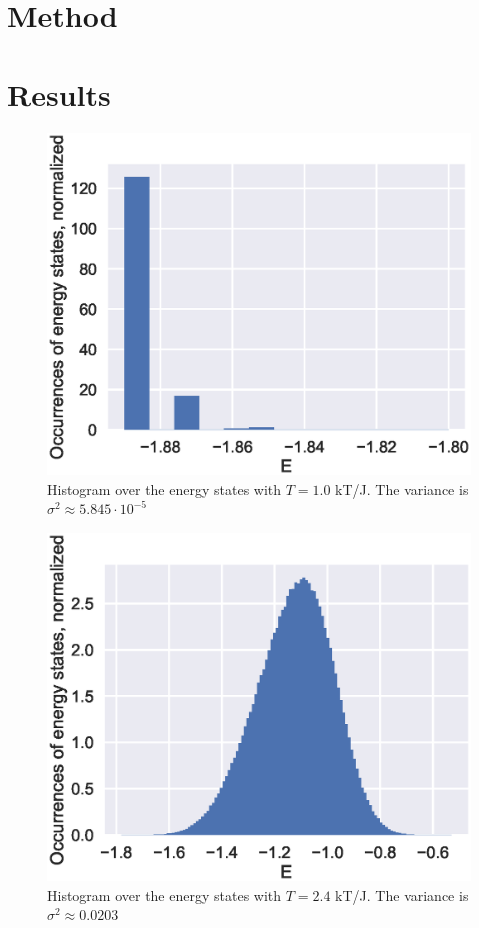 \documentclass[aps,reprint]{revtex4-1}
\begin{document}
\section{Method}
\label{sec:method}

\section{Results}
\label{sec:results}

\begin{figure}[ht]
  \centering
  \includegraphics[width=\columnwidth]{figures/4da.eps}
  \caption{\label{fig:4da} Histogram over the energy states with \(T=1.0\) kT/J.
  The variance is \(\sigma^{2} \approx 5.845\cdot 10^{-5}\)}
\end{figure}

\begin{figure}[ht]
  \centering
  \includegraphics[width=\columnwidth]{figures/4db.eps}
  \caption{\label{fig:4db} Histogram over the energy states with \(T=2.4\) kT/J.
  The variance is \(\sigma^{2} \approx 0.0203\)}
\end{figure}
\end{document}
